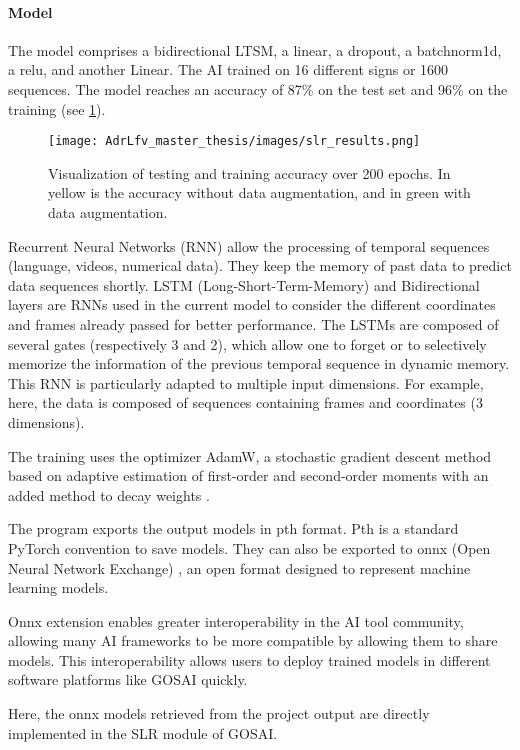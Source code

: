 \paragraph{Model}

The model comprises a bidirectional LTSM, a linear, a dropout, a batchnorm1d, a relu, and another Linear. The AI trained on 16 different signs or 1600 sequences. The model reaches an accuracy of 87\% on the test set and 96\% on the training (see \ref{fig:slr_results}).

\begin{figure}[h]
    \centering
    \texttt{[image: AdrLfv\_master\_thesis/images/slr\_results.png]}
    \caption{Visualization of testing and training accuracy over 200 epochs. In yellow is the accuracy without data augmentation, and in green with data augmentation.}
    \label{fig:slr_results}
\end{figure}

Recurrent Neural Networks (RNN) allow the processing of temporal sequences (language, videos, numerical data). They keep the memory of past data to predict data sequences shortly. 
LSTM (Long-Short-Term-Memory) and Bidirectional layers are RNNs used in the current model to consider the different coordinates and frames already passed for better performance. The LSTMs are composed of several gates (respectively 3 and 2), which allow one to forget or to selectively memorize the information of the previous temporal sequence in dynamic memory. This RNN is particularly adapted to multiple input dimensions. For example, here, the data is composed of sequences containing frames and coordinates (3 dimensions).
  
The training uses the optimizer AdamW, a stochastic gradient descent method based on adaptive estimation of first-order and second-order moments with an added method to decay weights \cite{loshchilov2017decoupled}. 

The program exports the output models in pth format. Pth is a standard PyTorch convention to save models. They can also be exported to onnx (Open Neural Network Exchange) \cite{onnx}, an open format designed to represent machine learning models.

Onnx extension enables greater interoperability in the AI tool community, allowing many AI frameworks to be more compatible by allowing them to share models. This interoperability allows users to deploy trained models in different software platforms like GOSAI quickly.

Here, the onnx models retrieved from the project output are directly implemented in the SLR module of GOSAI.


